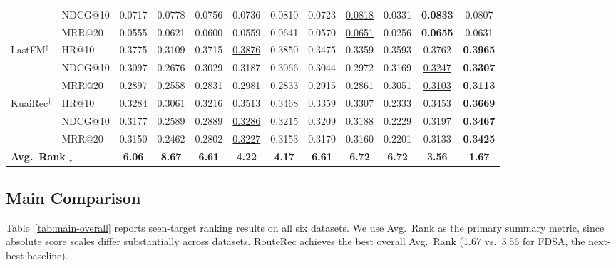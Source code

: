 \documentclass[sigconf,review,anonymous]{acmart}
\newcommand{\tblbest}[1]{\textbf{#1}}
\newcommand{\tblsecond}[1]{\underline{#1}}
\begin{document}
\begin{table}[!t]
{\begin{tabular}{ll*{9}{c}>{\columncolor{routerecgray}}c}
      & NDCG@10 & 0.0717 & 0.0778 & 0.0756 & 0.0736 & 0.0810 & 0.0723 & \tblsecond{0.0818} & 0.0331 & \tblbest{0.0833} & 0.0807 \\
      & MRR@20  & 0.0555 & 0.0621 & 0.0600 & 0.0559 & 0.0641 & 0.0570 & \tblsecond{0.0651} & 0.0256 & \tblbest{0.0655} & 0.0631 \\
    \midrule
    \multirow{3}{*}{LastFM$^\dagger$}
      & HR@10   & 0.3775 & 0.3109 & 0.3715 & \tblsecond{0.3876} & 0.3850 & 0.3475 & 0.3359 & 0.3593 & 0.3762 & \tblbest{0.3965} \\
      & NDCG@10 & 0.3097 & 0.2676 & 0.3029 & 0.3187 & 0.3066 & 0.3044 & 0.2972 & 0.3169 & \tblsecond{0.3247} & \tblbest{0.3307} \\
      & MRR@20  & 0.2897 & 0.2558 & 0.2831 & 0.2981 & 0.2833 & 0.2915 & 0.2861 & 0.3051 & \tblsecond{0.3103} & \tblbest{0.3113} \\
    \midrule
    \multirow{3}{*}{KuaiRec$^\dagger$}
      & HR@10   & 0.3284 & 0.3061 & 0.3216 & \tblsecond{0.3513} & 0.3468 & 0.3359 & 0.3307 & 0.2333 & 0.3453 & \tblbest{0.3669} \\
      & NDCG@10 & 0.3177 & 0.2589 & 0.2889 & \tblsecond{0.3286} & 0.3215 & 0.3209 & 0.3188 & 0.2229 & 0.3197 & \tblbest{0.3467} \\
      & MRR@20  & 0.3150 & 0.2462 & 0.2802 & \tblsecond{0.3227} & 0.3153 & 0.3170 & 0.3160 & 0.2201 & 0.3133 & \tblbest{0.3425} \\
    \midrule
    \multicolumn{2}{l}{\textbf{Avg.~Rank$\downarrow$}} & \textbf{6.06} & \textbf{8.67} & \textbf{6.61} & \textbf{4.22} & \textbf{4.17} & \textbf{6.61} & \textbf{6.72} & \textbf{6.72} & \textbf{3.56} & \textbf{1.67} \\
    \bottomrule
  \end{tabular}}
\end{table}

\subsection{Main Comparison}
\label{sec:overall-performance}

Table~\ref{tab:main-overall} reports seen-target ranking results on all six datasets. We use Avg.~Rank as the primary summary metric, since absolute score scales differ substantially across datasets. RouteRec achieves the best overall Avg.~Rank (1.67 vs.\ 3.56 for FDSA, the next-best baseline).
\end{document}
